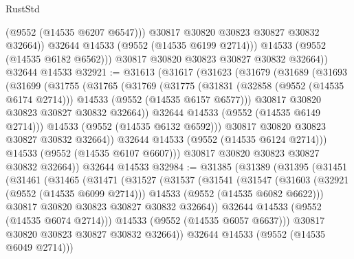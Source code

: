 \begin{lexlean}{RustStd}
\begin{coremodule}
                  (@9552 (@14535 @6207 @6547)))
                @30817
                @30820
                @30823
                @30827
                @30832
                @32664))
            @32644
            @14533
            (@9552 (@14535 @6199 @2714)))
          @14533
          (@9552 (@14535 @6182 @6562)))
        @30817
        @30820
        @30823
        @30827
        @30832
        @32664))
    @32644
    @14533
@32921 := @31613
    (@31617
      (@31623
        (@31679
          (@31689
            (@31693
              (@31699
                (@31755
                  (@31765
                    (@31769
                      (@31775
                        (@31831
                          (@32858 (@9552 (@14535 @6174 @2714)))
                          @14533
                          (@9552 (@14535 @6157 @6577)))
                        @30817
                        @30820
                        @30823
                        @30827
                        @30832
                        @32664))
                    @32644
                    @14533
                    (@9552 (@14535 @6149 @2714)))
                  @14533
                  (@9552 (@14535 @6132 @6592)))
                @30817
                @30820
                @30823
                @30827
                @30832
                @32664))
            @32644
            @14533
            (@9552 (@14535 @6124 @2714)))
          @14533
          (@9552 (@14535 @6107 @6607)))
        @30817
        @30820
        @30823
        @30827
        @30832
        @32664))
    @32644
    @14533
@32984 := @31385
    (@31389
      (@31395
        (@31451
          (@31461
            (@31465
              (@31471
                (@31527
                  (@31537
                    (@31541
                      (@31547
                        (@31603
                          (@32921 (@9552 (@14535 @6099 @2714)))
                          @14533
                          (@9552 (@14535 @6082 @6622)))
                        @30817
                        @30820
                        @30823
                        @30827
                        @30832
                        @32664))
                    @32644
                    @14533
                    (@9552 (@14535 @6074 @2714)))
                  @14533
                  (@9552 (@14535 @6057 @6637)))
                @30817
                @30820
                @30823
                @30827
                @30832
                @32664))
            @32644
            @14533
            (@9552 (@14535 @6049 @2714)))

\end{coremodule}
\end{lexlean}

